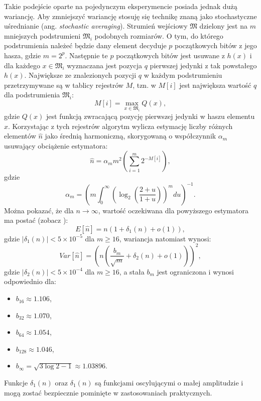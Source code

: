 Takie podejście oparte na pojedynczym eksperymencie posiada jednak dużą wariancję. Aby zmniejszyć wariancję stosuję się technikę znaną jako stochastyczne uśrednianie (ang. \textit{stochastic averaging}). Strumień wejściowy $\mathfrak{M}$ dzielony jest na $m$ mniejszych podstrumieni $\mathfrak{M}_i$ podobnych rozmiarów. O tym, do którego podstrumienia należeć będzie dany element decyduje $p$ początkowych bitów z jego hasza, gdzie $m = 2^p$. Następnie te $p$ początkowych bitów jest usuwane z $h(x)$ i dla  każdego $x\in \mathfrak{M}_i$ wyznaczana jest pozycja $q$ pierwszej jedynki z tak powstałego $h(x)$. Największe ze znalezionych pozycji $q$ w każdym podstrumieniu przetrzymywane są w tablicy rejestrów $M$, tzn. w $M[i]$ jest największa wartość $q$
dla podstrumienia $\mathfrak{M}_i$:
\begin{equation}
    M[i] = \max_{x \in \mathfrak{M}_i} Q(x),
\end{equation}
gdzie $Q(x)$ jest funkcją zwracającą  pozycję pierwszej jedynki w haszu elementu $x$.
 Korzystając z tych rejestrów algorytm wylicza estymację liczby różnych elementów $\hat{n}$
 jako średnią harmoniczną, skorygowaną o współczynnik ${\alpha}_{m}$ usuwający obciążenie estymatora:
\begin{equation}
    \hat{n} = {\alpha}_m{m}^{2}(\sum_{i=1}^{m} 2^{-M[i]}),
\end{equation}
gdzie
\begin{equation}
    {\alpha}_{m} = (m \int_{0}^{\infty} ({\log}_2(\frac{2 + u}{1 + u}))^m du)^{-1}.
\end{equation}
Można pokazać, że dla  $n \rightarrow \infty$, wartość oczekiwana dla powyższego estymatora ma postać (zobacz \cite{hll}):
\begin{equation}
    E[\hat{n}] = n(1 + {\delta}_1(n) + o(1)),
\end{equation}
gdzie $|{\delta}_1(n)| < 5 \times 10^{-5}$ dla $m \geq 16$, wariancja natomiast wynosi:
\begin{equation}
    Var[\hat{n}] = (n(\frac{{b}_m}{\sqrt{m}} + {\delta}_2(n) + o(1)))^2,
    \label{hll_var}
\end{equation}
 gdzie $|{\delta}_2(n)| < 5 \times 10^{-4}$ dla $m \geq 16$, a stała ${b}_m$ jest ograniczona i wynosi odpowiednio dla: 
 \begin{itemize}
 	\item ${b}_{16} \approx 1.106$, 
 	\item ${b}_{32} \approx 1.070$, 
 	\item ${b}_{64} \approx 1.054$, 
 	\item ${b}_{128} \approx 1.046$, 
 	\item ${b}_{\infty} = \sqrt{3\log{2} - 1} \approx 1.03896$. 
 \end{itemize}
 Funkcje ${\delta}_1(n)$ oraz ${\delta}_1(n)$ są funkcjami oscylującymi o małej amplitudzie i mogą zostać bezpiecznie pominięte w zastosowaniach praktycznych.

